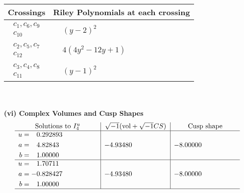 \documentclass[1p]{elsarticle_modified}
\theoremstyle{definition}
\newcommand{\I}{\sqrt{-1}}
\begin{document}
\begin{tabular}{m{50pt}|m{274pt}}
Crossings & \hspace{64pt}Riley Polynomials at each crossing \\
\hline $$\begin{aligned}c_{1},c_{6},c_{9}\\c_{10}\end{aligned}$$&$\begin{aligned}
&(y-2)^2
\end{aligned}$\\
\hline $$\begin{aligned}c_{2},c_{5},c_{7}\\c_{12}\end{aligned}$$&$\begin{aligned}
&4(4 y^2-12 y+1)
\end{aligned}$\\
\hline $$\begin{aligned}c_{3},c_{4},c_{8}\\c_{11}\end{aligned}$$&$\begin{aligned}
&(y-1)^2
\end{aligned}$\\
\hline
\end{tabular}\\~\\
\newpage\flushleft \textbf{(vi) Complex Volumes and Cusp Shapes}
$$\begin{array}{c|c|c}  
\text{Solutions to }I^u_{4}& \I (\text{vol} + \sqrt{-1}CS) & \text{Cusp shape}\\
 \hline 
\begin{aligned}
u &= \phantom{-}0.292893\phantom{ +0.000000I} \\
a &= \phantom{-}4.82843\phantom{ +0.000000I} \\
b &= \phantom{-}1.00000\phantom{ +0.000000I}\end{aligned}
 & -4.93480\phantom{ +0.000000I} & -8.00000\phantom{ +0.000000I} \\ \hline\begin{aligned}
u &= \phantom{-}1.70711\phantom{ +0.000000I} \\
a &= -0.828427\phantom{ +0.000000I} \\
b &= \phantom{-}1.00000\phantom{ +0.000000I}\end{aligned}
 & -4.93480\phantom{ +0.000000I} & -8.00000\phantom{ +0.000000I}\\
 \hline 
 \end{array}$$\newpage\newpage\renewcommand{\arraystretch}{1}
\end{document}
